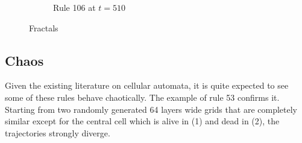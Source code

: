 \documentclass{article}
\begin{document}
\begin{figure}[H]
\begin{subfigure}[b]{0.46\textwidth}
        \caption{Rule 106 at $t=510$}
        \label{fig:rule-106-time-510-OneAlive}
    \end{subfigure}
    \caption{Fractals}
    \label{fig:fractals}
\end{figure}

\pagebreak
\subsection{Chaos} \label{chaos}
Given the existing literature on cellular automata, it is quite expected to see some of these rules behave chaotically. The example of rule 53 confirms it. Starting from two randomly generated 64 layers wide grids that are completely similar except for the central cell which is alive in (1) and dead in (2), the trajectories strongly diverge.

\medskip
\end{document}
